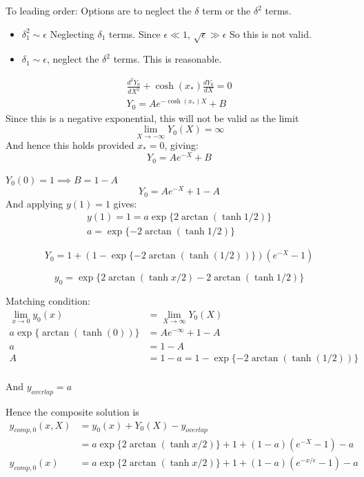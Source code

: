 \documentclass{X:/Documents/Coding/Latex/myassignment}
\begin{document}
\begin{enumerate}
\begin{enumerate}
		To leading order:
		Options are to neglect the $\delta$ term or the $\delta^2$ terms.
		\begin{itemize}
			\item $\delta_1^2 \sim \epsilon$
			Neglecting $\delta_1$ terms. Since $\epsilon \ll 1$, $\sqrt{\epsilon} \gg \epsilon$
			So this is not valid.

			\item $\delta_1 \sim \epsilon$, neglect the $\delta^2$ terms.
			This is reasonable.
			
		\end{itemize}
		\begin{align*}
			\frac{d^2Y_0}{dX^2} + \cosh(x_*) \frac{dY_0}{dX} = 0\\
			Y_0 = Ae^{-\cosh(x_*)X} + B	
		\end{align*}
		Since this is a negative exponential, this will not be valid as the limit
		\[\lim_{X\to-\infty} Y_0(X) = \infty\]
		And hence this holds provided $x_* =0$, giving:
		\[Y_0 = Ae^{-X} + B\]

		$Y_0(0) = 1 \implies B = 1-A$
		\[\boxed{Y_0 = Ae^{-X} + 1 -A}\]
		And applying $y(1) = 1$ gives:
		\begin{align*}
		y(1) = 1 = a\exp\{2\arctan\left(\tanh 1/2\right)\}\\
		a = \exp\{-2\arctan\left(\tanh 1/2\right)\}
		\end{align*}

		\[\boxed{Y_0 = 1 + \left(1- \exp\{-2\arctan(\tanh(1/2))\}\right)\left(e^{-X} - 1\right) }\]

		\[\boxed{y_{0} =\exp\{2\arctan\left(\tanh x/2\right) -2\arctan\left(\tanh 1/2\right) \} } \]


		Matching condition:
		\begin{align*}
			\lim_{x\to 0} y_0(x) &= \lim_{X \to \infty} Y_0(X)\\
			a\exp\{\arctan(\tanh(0))\} &= Ae^{-\infty} + 1 -A\\
			a &= 1-A\\
			A &= 1-a = 1- \exp\{-2\arctan(\tanh(1/2))\} \\
		\end{align*}

		And $y_{overlap} = a$

		Hence the composite solution is
		\begin{align*}
			y_{comp,0}(x,X) &= y_0(x) + Y_0(X) - y_{overlap}\\
			&=a\exp\{2\arctan\left(\tanh x/2\right)\} + 1 + \left(1- a\right)\left(e^{-X} - 1\right) - a\\
			y_{comp,0}(x) &=a\exp\{2\arctan\left(\tanh x/2\right)\} + 1 + \left(1- a\right)\left(e^{-x/\epsilon} - 1\right) - a\\
		\end{align*}


\end{enumerate}
\end{enumerate}
\end{document}
